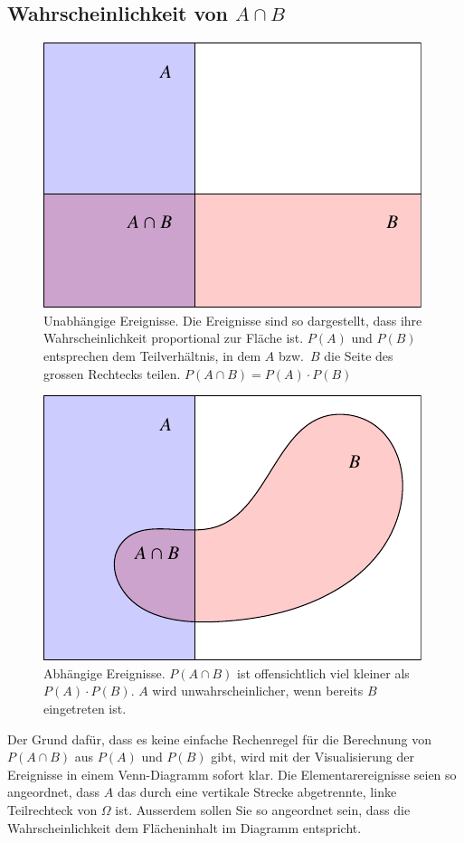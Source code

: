 \subsection{Wahrscheinlichkeit von \texorpdfstring{$A\cap B$}{A geschnitten B}}
\begin{figure}
\begin{center}
\includegraphics{images/abhaengigkeit-1}
\end{center}
\caption{Unabhängige Ereignisse.
Die Ereignisse sind so dargestellt,
dass ihre Wahrscheinlichkeit proportional zur Fläche ist.
$P(A)$ und $P(B)$
entsprechen dem Teilverhältnis, in dem $A$ bzw.~$B$ die Seite des grossen
Rechtecks teilen.
$P(A\cap B)=P(A)\cdot P(B)$\label{unabhaengig}}
\end{figure}
\begin{figure}
\begin{center}
\includegraphics{images/abhaengigkeit-2}
\end{center}
\caption{Abhängige Ereignisse.
$P(A\cap B)$ ist offensichtlich viel kleiner
als $P(A)\cdot P(B)$.
$A$ wird unwahrscheinlicher, wenn bereits $B$ eingetreten
ist.
\label{abhaengig}}
\end{figure}
Der Grund dafür, dass es keine einfache Rechenregel für die Berechnung von 
$P(A\cap B)$ aus $P(A)$ und $P(B)$ gibt, wird mit der
Visualisierung der Ereignisse in einem Venn-Diagramm sofort klar.
Die Elementarereignisse seien so angeordnet, dass $A$ das durch eine
vertikale Strecke abgetrennte, linke Teilrechteck von $\Omega$ ist.
Ausserdem
sollen Sie so angeordnet sein, dass die Wahrscheinlichkeit dem
Flächeninhalt im Diagramm entspricht.

